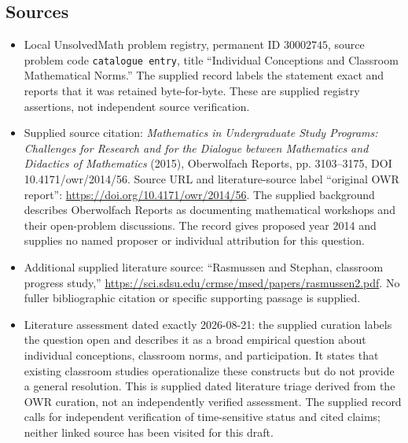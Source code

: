 \documentclass[11pt]{article}
\begin{document}
\subsection{Sources}
\begin{itemize}
\item Local UnsolvedMath problem registry, permanent ID \(30002745\), source problem code \texttt{catalogue entry}, title ``Individual Conceptions and Classroom Mathematical Norms.'' The supplied record labels the statement exact and reports that it was retained byte-for-byte. These are supplied registry assertions, not independent source verification.
\item Supplied source citation: \emph{Mathematics in Undergraduate Study Programs: Challenges for Research and for the Dialogue between Mathematics and Didactics of Mathematics} (2015), Oberwolfach Reports, pp. 3103--3175, DOI 10.4171/owr/2014/56. Source URL and literature-source label ``original OWR report'': \url{https://doi.org/10.4171/owr/2014/56}. The supplied background describes Oberwolfach Reports as documenting mathematical workshops and their open-problem discussions. The record gives proposed year 2014 and supplies no named proposer or individual attribution for this question.
\item Additional supplied literature source: ``Rasmussen and Stephan, classroom progress study,'' \url{https://sci.sdsu.edu/crmse/msed/papers/rasmussen2.pdf}. No fuller bibliographic citation or specific supporting passage is supplied.
\item Literature assessment dated exactly 2026-08-21: the supplied curation labels the question open and describes it as a broad empirical question about individual conceptions, classroom norms, and participation. It states that existing classroom studies operationalize these constructs but do not provide a general resolution. This is supplied dated literature triage derived from the OWR curation, not an independently verified assessment. The supplied record calls for independent verification of time-sensitive status and cited claims; neither linked source has been visited for this draft.
\end{itemize}
\end{document}
